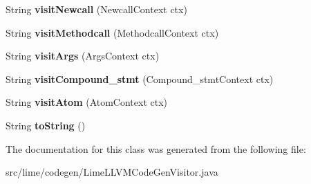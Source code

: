 \begin{DoxyCompactItemize}
String {\bfseries visit\+Newcall} (Newcall\+Context ctx)
\item 
\mbox{\label{classlime_1_1codegen_1_1LimeLLVMCodeGenVisitor_a9b1d39c71e64d1c358e827cd6f799ba6}} 
String {\bfseries visit\+Methodcall} (Methodcall\+Context ctx)
\item 
\mbox{\label{classlime_1_1codegen_1_1LimeLLVMCodeGenVisitor_a98d37a702a5eed85607f570b257ed7f0}} 
String {\bfseries visit\+Args} (Args\+Context ctx)
\item 
\mbox{\label{classlime_1_1codegen_1_1LimeLLVMCodeGenVisitor_af5d2d7e29e080f5fec2da5d965a42508}} 
String {\bfseries visit\+Compound\+\_\+stmt} (Compound\+\_\+stmt\+Context ctx)
\item 
\mbox{\label{classlime_1_1codegen_1_1LimeLLVMCodeGenVisitor_a29eed527a4bb21671463af9ffe9e63d6}} 
String {\bfseries visit\+Atom} (Atom\+Context ctx)
\item 
\mbox{\label{classlime_1_1codegen_1_1LimeLLVMCodeGenVisitor_a6d87ff843aecce85d70ac6c92e7247fb}} 
String {\bfseries to\+String} ()
\end{DoxyCompactItemize}


The documentation for this class was generated from the following file\+:\begin{DoxyCompactItemize}
\item 
src/lime/codegen/Lime\+L\+L\+V\+M\+Code\+Gen\+Visitor.\+java\end{DoxyCompactItemize}
